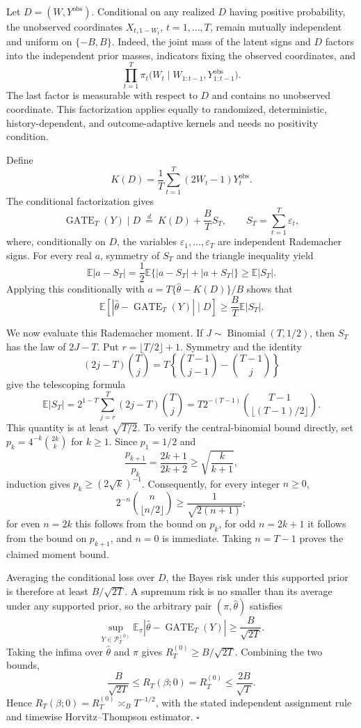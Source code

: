 Let \(D=(W,Y^{\mathrm{obs}})\). Conditional on any realized \(D\) having positive probability, the unobserved coordinates \(X_{t,1-W_t}\), \(t=1,\ldots,T\), remain mutually independent and uniform on \(\{-B,B\}\). Indeed, the joint mass of the latent signs and \(D\) factors into the independent prior masses, indicators fixing the observed coordinates, and
\[
\prod_{t=1}^T\pi_t\bigl(W_t\mid W_{1:t-1},Y_{1:t-1}^{\mathrm{obs}}\bigr).
\]
The last factor is measurable with respect to \(D\) and contains no unobserved coordinate. This factorization applies equally to randomized, deterministic, history-dependent, and outcome-adaptive kernels and needs no positivity condition.

Define
\[
K(D)=\frac1T\sum_{t=1}^T(2W_t-1)Y_t^{\mathrm{obs}}.
\]
The conditional factorization gives
\[
\operatorname{GATE}_T(Y)\mid D
\ \overset{d}{=}\ K(D)+\frac BT S_T,
\qquad S_T=\sum_{t=1}^T\varepsilon_t,
\]
where, conditionally on \(D\), the variables \(\varepsilon_1,\ldots,\varepsilon_T\) are independent Rademacher signs. For every real \(a\), symmetry of \(S_T\) and the triangle inequality yield
\[
\mathbb E|a-S_T|
=\frac12\mathbb E\{|a-S_T|+|a+S_T|\}
\ge \mathbb E|S_T|.
\]
Applying this conditionally with \(a=T\{\widehat\theta-K(D)\}/B\) shows that
\[
\mathbb E\left[\left|\widehat\theta-\operatorname{GATE}_T(Y)\right|\mid D\right]
\ge \frac BT\mathbb E|S_T|.
\]

We now evaluate this Rademacher moment. If \(J\sim\operatorname{Binomial}(T,1/2)\), then \(S_T\) has the law of \(2J-T\). Put \(r=\lfloor T/2\rfloor+1\). Symmetry and the identity
\[
(2j-T)\binom Tj
=T\left\{\binom{T-1}{j-1}-\binom{T-1}{j}\right\}
\]
give the telescoping formula
\[
\mathbb E|S_T|
=2^{1-T}\sum_{j=r}^T(2j-T)\binom Tj
=T2^{-(T-1)}\binom{T-1}{\lfloor(T-1)/2\rfloor}.
\]
This quantity is at least \(\sqrt{T/2}\). To verify the central-binomial bound directly, set \(p_k=4^{-k}\binom{2k}{k}\) for \(k\ge1\). Since \(p_1=1/2\) and
\[
\frac{p_{k+1}}{p_k}=\frac{2k+1}{2k+2}\ge\sqrt{\frac{k}{k+1}},
\]
induction gives \(p_k\ge(2\sqrt{k})^{-1}\). Consequently, for every integer \(n\ge0\),
\[
2^{-n}\binom n{\lfloor n/2\rfloor}\ge\frac1{\sqrt{2(n+1)}};
\]
for even \(n=2k\) this follows from the bound on \(p_k\), for odd \(n=2k+1\) it follows from the bound on \(p_{k+1}\), and \(n=0\) is immediate. Taking \(n=T-1\) proves the claimed moment bound.

Averaging the conditional loss over \(D\), the Bayes risk under this supported prior is therefore at least \(B/\sqrt{2T}\). A supremum risk is no smaller than its average under any supported prior, so the arbitrary pair \((\pi,\widehat\theta)\) satisfies
\[
\sup_{Y\in\mathcal P_T^{(0)}}\mathbb E_\pi\left|\widehat\theta-\operatorname{GATE}_T(Y)\right|
\ge\frac{B}{\sqrt{2T}}.
\]
Taking the infima over \(\widehat\theta\) and \(\pi\) gives \(R_T^{(0)}\ge B/\sqrt{2T}\). Combining the two bounds,
\[
\frac{B}{\sqrt{2T}}
\le R_T(\beta;0)=R_T^{(0)}
\le\frac{2B}{\sqrt T}.
\]
Hence \(R_T(\beta;0)=R_T^{(0)}\asymp_B T^{-1/2}\), with the stated independent assignment rule and timewise Horvitz--Thompson estimator. \(\square\)
